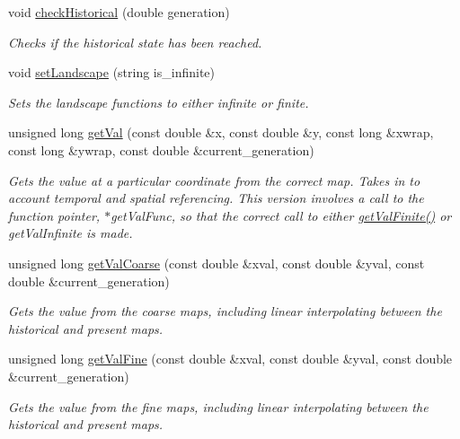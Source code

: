 \begin{DoxyCompactItemize}
\item 
void \hyperlink{class_landscape_ae4a7ae12f299407d5c379fd20ed2ccbc}{check\+Historical} (double generation)
\begin{DoxyCompactList}\small\item\em Checks if the historical state has been reached. \end{DoxyCompactList}\item 
void \hyperlink{class_landscape_a63150f634d7936439bc5a1d20b84a7b2}{set\+Landscape} (string is\+\_\+infinite)
\begin{DoxyCompactList}\small\item\em Sets the landscape functions to either infinite or finite. \end{DoxyCompactList}\item 
unsigned long \hyperlink{class_landscape_a06dbce690810d8d771490c310cb96310}{get\+Val} (const double \&x, const double \&y, const long \&xwrap, const long \&ywrap, const double \&current\+\_\+generation)
\begin{DoxyCompactList}\small\item\em Gets the value at a particular coordinate from the correct map. Takes in to account temporal and spatial referencing. This version involves a call to the function pointer, $\ast$get\+Val\+Func, so that the correct call to either \hyperlink{class_landscape_a736605cefe34af236a4f8da38276a12e}{get\+Val\+Finite()} or get\+Val\+Infinite is made. \end{DoxyCompactList}\item 
unsigned long \hyperlink{class_landscape_aa98fad5a154486dbb0bca6056e19399c}{get\+Val\+Coarse} (const double \&xval, const double \&yval, const double \&current\+\_\+generation)
\begin{DoxyCompactList}\small\item\em Gets the value from the coarse maps, including linear interpolating between the historical and present maps. \end{DoxyCompactList}\item 
unsigned long \hyperlink{class_landscape_a33a1d5c3fba6c895ad3d390a547e0361}{get\+Val\+Fine} (const double \&xval, const double \&yval, const double \&current\+\_\+generation)
\begin{DoxyCompactList}\small\item\em Gets the value from the fine maps, including linear interpolating between the historical and present maps. \end{DoxyCompactList}\item 

\end{DoxyCompactItemize}
